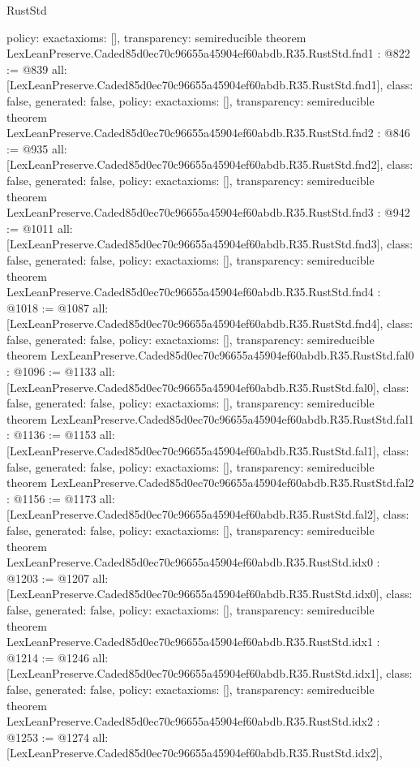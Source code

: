 \begin{lexlean}{RustStd}
\begin{coremodule}
{  policy: exact{axioms: []},
  transparency: semireducible
}
theorem LexLeanPreserve.Caded85d0ec70c96655a45904ef60abdb.R35.RustStd.fnd1 : @822 := @839 {
  all: [LexLeanPreserve.Caded85d0ec70c96655a45904ef60abdb.R35.RustStd.fnd1],
  class: false,
  generated: false,
  policy: exact{axioms: []},
  transparency: semireducible
}
theorem LexLeanPreserve.Caded85d0ec70c96655a45904ef60abdb.R35.RustStd.fnd2 : @846 := @935 {
  all: [LexLeanPreserve.Caded85d0ec70c96655a45904ef60abdb.R35.RustStd.fnd2],
  class: false,
  generated: false,
  policy: exact{axioms: []},
  transparency: semireducible
}
theorem LexLeanPreserve.Caded85d0ec70c96655a45904ef60abdb.R35.RustStd.fnd3 : @942 := @1011 {
  all: [LexLeanPreserve.Caded85d0ec70c96655a45904ef60abdb.R35.RustStd.fnd3],
  class: false,
  generated: false,
  policy: exact{axioms: []},
  transparency: semireducible
}
theorem LexLeanPreserve.Caded85d0ec70c96655a45904ef60abdb.R35.RustStd.fnd4 : @1018 := @1087 {
  all: [LexLeanPreserve.Caded85d0ec70c96655a45904ef60abdb.R35.RustStd.fnd4],
  class: false,
  generated: false,
  policy: exact{axioms: []},
  transparency: semireducible
}
theorem LexLeanPreserve.Caded85d0ec70c96655a45904ef60abdb.R35.RustStd.fal0 : @1096 := @1133 {
  all: [LexLeanPreserve.Caded85d0ec70c96655a45904ef60abdb.R35.RustStd.fal0],
  class: false,
  generated: false,
  policy: exact{axioms: []},
  transparency: semireducible
}
theorem LexLeanPreserve.Caded85d0ec70c96655a45904ef60abdb.R35.RustStd.fal1 : @1136 := @1153 {
  all: [LexLeanPreserve.Caded85d0ec70c96655a45904ef60abdb.R35.RustStd.fal1],
  class: false,
  generated: false,
  policy: exact{axioms: []},
  transparency: semireducible
}
theorem LexLeanPreserve.Caded85d0ec70c96655a45904ef60abdb.R35.RustStd.fal2 : @1156 := @1173 {
  all: [LexLeanPreserve.Caded85d0ec70c96655a45904ef60abdb.R35.RustStd.fal2],
  class: false,
  generated: false,
  policy: exact{axioms: []},
  transparency: semireducible
}
theorem LexLeanPreserve.Caded85d0ec70c96655a45904ef60abdb.R35.RustStd.idx0 : @1203 := @1207 {
  all: [LexLeanPreserve.Caded85d0ec70c96655a45904ef60abdb.R35.RustStd.idx0],
  class: false,
  generated: false,
  policy: exact{axioms: []},
  transparency: semireducible
}
theorem LexLeanPreserve.Caded85d0ec70c96655a45904ef60abdb.R35.RustStd.idx1 : @1214 := @1246 {
  all: [LexLeanPreserve.Caded85d0ec70c96655a45904ef60abdb.R35.RustStd.idx1],
  class: false,
  generated: false,
  policy: exact{axioms: []},
  transparency: semireducible
}
theorem LexLeanPreserve.Caded85d0ec70c96655a45904ef60abdb.R35.RustStd.idx2 : @1253 := @1274 {
  all: [LexLeanPreserve.Caded85d0ec70c96655a45904ef60abdb.R35.RustStd.idx2],
}
\end{coremodule}
\end{lexlean}
